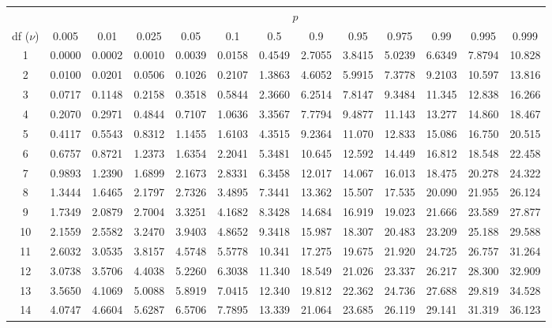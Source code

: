 \begin{table}[htbp]
	\centering
	\setlength{\tabcolsep}{7pt}
	\begin{tabular}{ccccccccccccc}
		& \multicolumn{12}{c}{$p$}\\
		\cline{2-13}
		df ($\nu$) & 0.005 & 0.01 & 0.025 & 0.05 & 0.1 & 0.5 & 0.9 & 0.95 & 0.975 & 0.99 & 0.995 & 0.999 \\
		\hline
		1   & 0.0000 & 0.0002 & 0.0010 & 0.0039 & 0.0158 & 0.4549 & 2.7055 & 3.8415 & 5.0239 & 6.6349 & 7.8794 & 10.828 \\
		2   & 0.0100 & 0.0201 & 0.0506 & 0.1026 & 0.2107 & 1.3863 & 4.6052 & 5.9915 & 7.3778 & 9.2103 & 10.597 & 13.816 \\
		3   & 0.0717 & 0.1148 & 0.2158 & 0.3518 & 0.5844 & 2.3660 & 6.2514 & 7.8147 & 9.3484 & 11.345 & 12.838 & 16.266 \\
		4   & 0.2070 & 0.2971 & 0.4844 & 0.7107 & 1.0636 & 3.3567 & 7.7794 & 9.4877 & 11.143 & 13.277 & 14.860 & 18.467 \\
		5   & 0.4117 & 0.5543 & 0.8312 & 1.1455 & 1.6103 & 4.3515 & 9.2364 & 11.070 & 12.833 & 15.086 & 16.750 & 20.515 \\
		6   & 0.6757 & 0.8721 & 1.2373 & 1.6354 & 2.2041 & 5.3481 & 10.645 & 12.592 & 14.449 & 16.812 & 18.548 & 22.458 \\
		7   & 0.9893 & 1.2390 & 1.6899 & 2.1673 & 2.8331 & 6.3458 & 12.017 & 14.067 & 16.013 & 18.475 & 20.278 & 24.322 \\
		8   & 1.3444 & 1.6465 & 2.1797 & 2.7326 & 3.4895 & 7.3441 & 13.362 & 15.507 & 17.535 & 20.090 & 21.955 & 26.124 \\
		9   & 1.7349 & 2.0879 & 2.7004 & 3.3251 & 4.1682 & 8.3428 & 14.684 & 16.919 & 19.023 & 21.666 & 23.589 & 27.877 \\
		10  & 2.1559 & 2.5582 & 3.2470 & 3.9403 & 4.8652 & 9.3418 & 15.987 & 18.307 & 20.483 & 23.209 & 25.188 & 29.588 \\[5pt]
		11  & 2.6032 & 3.0535 & 3.8157 & 4.5748 & 5.5778 & 10.341 & 17.275 & 19.675 & 21.920 & 24.725 & 26.757 & 31.264 \\
		12  & 3.0738 & 3.5706 & 4.4038 & 5.2260 & 6.3038 & 11.340 & 18.549 & 21.026 & 23.337 & 26.217 & 28.300 & 32.909 \\
		13  & 3.5650 & 4.1069 & 5.0088 & 5.8919 & 7.0415 & 12.340 & 19.812 & 22.362 & 24.736 & 27.688 & 29.819 & 34.528 \\
		14  & 4.0747 & 4.6604 & 5.6287 & 6.5706 & 7.7895 & 13.339 & 21.064 & 23.685 & 26.119 & 29.141 & 31.319 & 36.123 \\

\end{tabular}
\end{table}
